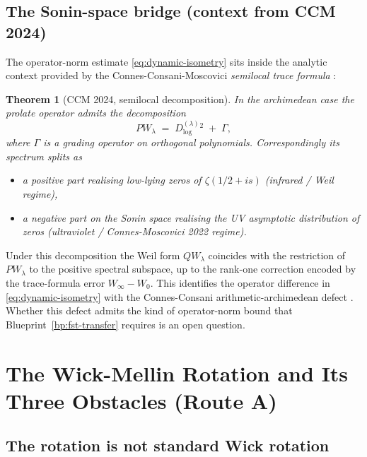 \documentclass[11pt,a4paper]{article}
\theoremstyle{plain}
\newtheorem{theorem}{Theorem}[section]
\theoremstyle{definition}
\begin{document}
\subsection{The Sonin-space bridge (context from CCM 2024)}
\label{sec:sonin}

The operator-norm estimate \eqref{eq:dynamic-isometry} sits inside
the analytic context provided by the Connes-Consani-Moscovici
\emph{semilocal trace formula} \cite{ConnesConsaniMoscovici2024}:

\begin{theorem}[CCM 2024, semilocal decomposition]\label{thm:ccm-semilocal}
In the archimedean case the prolate operator admits the
decomposition
\[
  PW_\lambda \;=\; D^{(\lambda)}_{\log}{}^2 \;+\; \Gamma,
\]
where $\Gamma$ is a grading operator on orthogonal polynomials.
Correspondingly its spectrum splits as
\begin{itemize}[leftmargin=*]
\item a \emph{positive part} realising low-lying zeros of
  $\zeta(1/2+is)$ (infrared / Weil regime),
\item a \emph{negative part} on the Sonin space realising the UV
  asymptotic distribution of zeros
  (ultraviolet / Connes-Moscovici 2022 regime).
\end{itemize}
\end{theorem}

Under this decomposition the Weil form $QW_\lambda$ coincides with
the restriction of $PW_\lambda$ to the positive spectral subspace,
up to the rank-one correction encoded by the trace-formula error
$W_\infty - W_0$.  This identifies the operator difference in
\eqref{eq:dynamic-isometry} with the Connes-Consani
arithmetic-archimedean defect
\cite{ConnesConsaniWeilPositivity2020}.  Whether this defect admits
the kind of operator-norm bound that Blueprint~\ref{bp:fst-transfer}
requires is an open question.

\section{The Wick-Mellin Rotation and Its Three Obstacles (Route A)}
\label{sec:wick-mellin-obstacles}

\subsection{The rotation is not standard Wick rotation}
\end{document}
